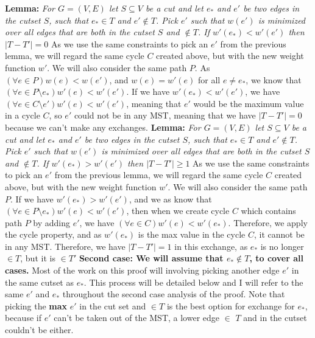 \documentclass{article}
\begin{document}
\textbf{Lemma:} \textit{For $G=(V,E)$ let $S \subseteq V$ be a cut and let $e_*$ and $e'$ be two edges in the cutset $S$, such that $e_* \in T$ and $e' \not\in T$. Pick $e'$ such that $w(e')$ is minimized over all edges that are both in the cutset $S$ and $\not\in T$. If $w'(e_*)<w'(e')$ then $|T-T'| = 0$}\newline 
As we use the same constraints to pick an $e'$ from the previous lemma, we will regard the same cycle $C$ created above, but with the new weight function $w'$. We will also consider the same path $P$. As $(\forall e \in P) w(e)< w(e')$, and $w(e)=w'(e)$ for all $e\neq e_*$, we know that $(\forall e \in P \setminus e_*) w'(e)< w'(e')$. If we have $w'(e_*)<w'(e')$, we have $ (\forall e \in C \setminus e') w'(e)< w'(e') $, meaning that $e'$ would be the maximum value in a cycle $C$, so $e'$ could not be in any MST, meaning that we have $|T-T'| = 0$ because we can't make any exchanges. \newline \newline
\textbf{Lemma:} \textit{For $G=(V,E)$ let $S \subseteq V$ be a cut and let $e_*$ and $e'$ be two edges in the cutset $S$, such that $e_* \in T$ and $e' \not\in T$. Pick $e'$ such that $w(e')$ is minimized over all edges that are both in the cutset $S$ and $\not\in T$. If $w'(e_*)>w'(e')$ then $|T-T'| \geq 1$}\newline
As we use the same constraints to pick an $e'$ from the previous lemma, we will regard the same cycle $C$ created above, but with the new weight function $w'$. We will also consider the same path $P$. If we have $w'(e_*)>w'(e')$, and we as know that $(\forall e \in P \setminus e_*) w'(e)< w'(e')$, then when we create cycle $C$ which contains path $P$ by adding $e'$, we have $(\forall e \in C) w'(e)< w'(e_*)$. Therefore, we apply the cycle property, and as $w'(e_*)$ is the max value in the cycle $C$, it cannot be in any MST. Therefore, we have $|T-T'| = 1$ in this exchange, as $e_*$ is no longer $\in T$, but it is $\in T'$ \newline \newline 
\textbf{Second case: We will assume that $e_* \not\in T$, to cover all cases.} \newline 
Most of the work on this proof will involving picking another edge $e'$ in the same cutset as $e_*$. This process will be detailed below and I will refer to the same $e'$ and $e_*$ throughout the second case analysis of the proof. Note that picking the \textbf{max} $e'$ in the cut set and $\in T$ is the best option for exchange for $e_*$, because if $e'$ can't be taken out of the MST, a lower edge $\in$ $T$ and in the cutset couldn't be either. \newline
\end{document}
